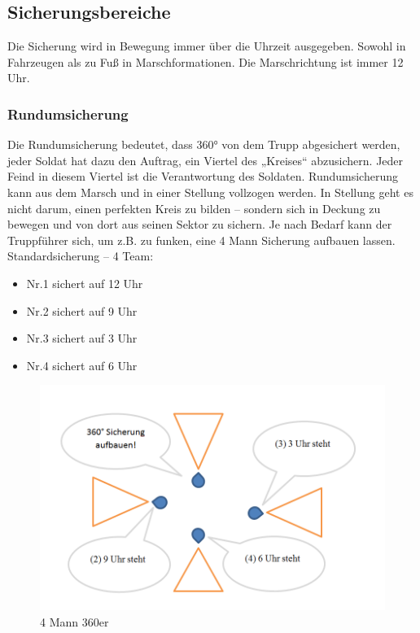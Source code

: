 \newpage
\subsection{Sicherungsbereiche}
Die Sicherung wird in Bewegung immer über die Uhrzeit ausgegeben. Sowohl in Fahrzeugen als zu Fuß in Marschformationen.  Die Marschrichtung ist immer 12 Uhr. \\
\subsubsection{Rundumsicherung}
Die Rundumsicherung bedeutet, dass 360° von dem Trupp abgesichert werden, jeder Soldat hat dazu den Auftrag, ein Viertel des „Kreises“ abzusichern. Jeder Feind in diesem Viertel ist die Verantwortung des Soldaten. Rundumsicherung kann aus dem Marsch und in einer Stellung vollzogen werden. In Stellung geht es nicht darum, einen perfekten Kreis zu bilden – sondern sich in Deckung zu bewegen und von dort aus seinen Sektor zu sichern. Je nach Bedarf kann der Truppführer sich, um z.B. zu funken, eine 4 Mann Sicherung aufbauen lassen. \\
Standardsicherung  – 4 Team: 
\begin{itemize}
\item Nr.1 sichert auf 12 Uhr 
\item Nr.2 sichert auf 9 Uhr 
\item Nr.3 sichert auf 3 Uhr 
\item Nr.4 sichert auf 6 Uhr 
\end{itemize}
\begin{figure}[htbp]
	\centering
	\includegraphics[width=15cm]{./Grafiken/Abschnitt/360er.png}
	\caption{4 Mann 360er}
\end{figure}

